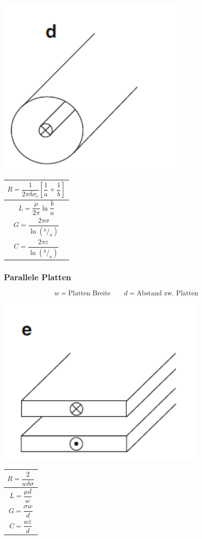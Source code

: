\includegraphics[width=0.4\columnwidth]{Figures/Koaxialleitung.png}
{\renewcommand*{\arraystretch}{0.2}
\begin{tabularx}{0.5\columnwidth}{|X|}
    \hline
    \[R=\frac{1}{2\pi\delta\sigma_c}\left[\frac{1}{a}+\frac{1}{b}\right]\] \\
    \hline
    \[L=\frac{\mu}{2\pi}\ln\frac{b}{a}\]                                   \\
    \hline
    \[G=\frac{2\pi\sigma}{\ln(^b/_a)}\]                                    \\
    \hline
    \[C=\frac{2\pi\varepsilon}{\ln(^b/_a)}\]                               \\
    \hline
\end{tabularx}}

\subsubsection{Parallele Platten}
\[
    w  = \text{Platten Breite} \qquad d  = \text{Abstand zw. Platten}
\]

\includegraphics[width=0.4\columnwidth]{Figures/Parallele_Platten.png}
{\renewcommand*{\arraystretch}{0.2}
\begin{tabularx}{0.5\columnwidth}{|X|}
    \hline
    \[R=\frac{2}{w\delta\sigma}\] \\
    \hline
    \[L=\frac{\mu d}{w}\]          \\
    \hline
    \[G=\frac{\sigma w}{d}\]       \\
    \hline
    \[C=\frac{w\varepsilon}{d}\]  \\
    \hline
\end{tabularx}}

